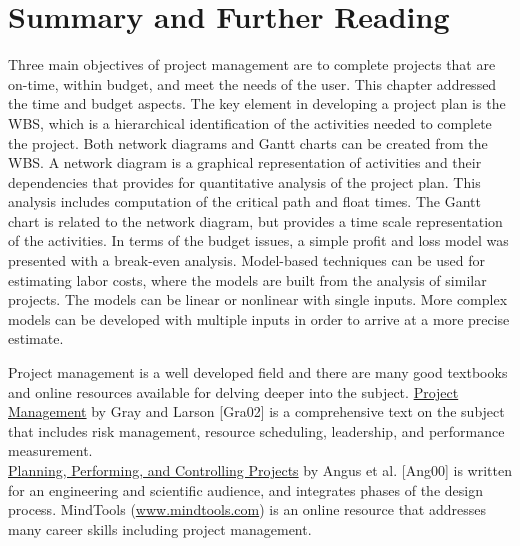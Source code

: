 \section{Summary and Further Reading}
\label{section:projectManagementSummary-and-further-reading}

Three main objectives of project management are to complete projects
that are on-time, within budget, and meet the needs of the user. This
chapter addressed the time and budget aspects. The key element in
developing a project plan is the WBS, which is a hierarchical
identification of the activities needed to complete the project. Both
network diagrams and Gantt charts can be created from the WBS. A network
diagram is a graphical representation of activities and their
dependencies that provides for quantitative analysis of the project
plan. This analysis includes computation of the critical path and float
times. The Gantt chart is related to the network diagram, but provides a
time scale representation of the activities. In terms of the budget
issues, a simple profit and loss model was presented with a break-even
analysis. Model-based techniques can be used for estimating labor costs,
where the models are built from the analysis of similar projects. The
models can be linear or nonlinear with single inputs. More complex
models can be developed with multiple inputs in order to arrive at a
more precise estimate.

Project management is a well developed field and there are many good
textbooks and online resources available for delving deeper into the
subject. \ul{Project Management} by Gray and Larson {[}Gra02{]} is a
comprehensive text on the subject that includes risk management,
resource scheduling, leadership, and performance measurement.\\
\ul{Planning, Performing, and Controlling Projects} by Angus et al.
{[}Ang00{]} is written for an engineering and scientific audience, and
integrates phases of the design process. MindTools
(\href{http://www.mindtools.com}{www.mindtools.com}) is an online
resource that addresses many career skills including project management.
